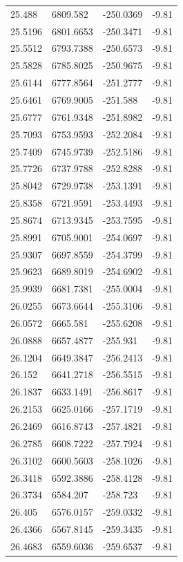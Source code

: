\begin{table}[H]
\begin{tabular}{llll}
25.488 & 6809.582 & -250.0369 & -9.81 \\
25.5196 & 6801.6653 & -250.3471 & -9.81 \\
25.5512 & 6793.7388 & -250.6573 & -9.81 \\
25.5828 & 6785.8025 & -250.9675 & -9.81 \\
25.6144 & 6777.8564 & -251.2777 & -9.81 \\
25.6461 & 6769.9005 & -251.588 & -9.81 \\
25.6777 & 6761.9348 & -251.8982 & -9.81 \\
25.7093 & 6753.9593 & -252.2084 & -9.81 \\
25.7409 & 6745.9739 & -252.5186 & -9.81 \\
25.7726 & 6737.9788 & -252.8288 & -9.81 \\
25.8042 & 6729.9738 & -253.1391 & -9.81 \\
25.8358 & 6721.9591 & -253.4493 & -9.81 \\
25.8674 & 6713.9345 & -253.7595 & -9.81 \\
25.8991 & 6705.9001 & -254.0697 & -9.81 \\
25.9307 & 6697.8559 & -254.3799 & -9.81 \\
25.9623 & 6689.8019 & -254.6902 & -9.81 \\
25.9939 & 6681.7381 & -255.0004 & -9.81 \\
26.0255 & 6673.6644 & -255.3106 & -9.81 \\
26.0572 & 6665.581 & -255.6208 & -9.81 \\
26.0888 & 6657.4877 & -255.931 & -9.81 \\
26.1204 & 6649.3847 & -256.2413 & -9.81 \\
26.152 & 6641.2718 & -256.5515 & -9.81 \\
26.1837 & 6633.1491 & -256.8617 & -9.81 \\
26.2153 & 6625.0166 & -257.1719 & -9.81 \\
26.2469 & 6616.8743 & -257.4821 & -9.81 \\
26.2785 & 6608.7222 & -257.7924 & -9.81 \\
26.3102 & 6600.5603 & -258.1026 & -9.81 \\
26.3418 & 6592.3886 & -258.4128 & -9.81 \\
26.3734 & 6584.207 & -258.723 & -9.81 \\
26.405 & 6576.0157 & -259.0332 & -9.81 \\
26.4366 & 6567.8145 & -259.3435 & -9.81 \\
26.4683 & 6559.6036 & -259.6537 & -9.81 \\

\end{tabular}
\end{table}

